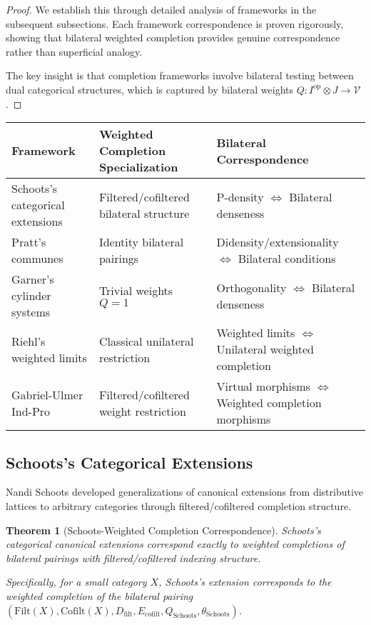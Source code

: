 \documentclass[11pt]{article}
\theoremstyle{plain}
\newtheorem{theorem}{Theorem}[section]
\theoremstyle{definition}
\theoremstyle{remark}
\newcommand{\V}{\mathcal{V}}
\newcommand{\op}{\mathrm{op}}
\begin{document}
\begin{proof}
We establish this through detailed analysis of frameworks in the subsequent subsections. Each framework correspondence is proven rigorously, showing that bilateral weighted completion provides genuine correspondence rather than superficial analogy.

The key insight is that completion frameworks involve bilateral testing between dual categorical structures, which is captured by bilateral weights $Q : I^{\op} \otimes J \to \V$.
\end{proof}

\begin{center}
\renewcommand{\arraystretch}{1.4}
\begin{longtable}{@{}p{3.5cm}p{3.5cm}p{7cm}@{}}
\toprule
\textbf{Framework} & \textbf{Weighted Completion Specialization} & \textbf{Bilateral Correspondence} \\
\midrule
Schoots's categorical extensions & Filtered/cofiltered bilateral structure & P-density $\Leftrightarrow$ Bilateral denseness \\
\addlinespace
Pratt's communes & Identity bilateral pairings & Didensity/extensionality $\Leftrightarrow$ Bilateral conditions \\
\addlinespace
Garner's cylinder systems & Trivial weights $Q = 1$ & Orthogonality $\Leftrightarrow$ Bilateral denseness \\
\addlinespace
Riehl's weighted limits & Classical unilateral restriction & Weighted limits $\Leftrightarrow$ Unilateral weighted completion \\
\addlinespace
Gabriel-Ulmer Ind-Pro & Filtered/cofiltered weight restriction & Virtual morphisms $\Leftrightarrow$ Weighted completion morphisms \\
\bottomrule
\end{longtable}
\end{center}

\subsection{Schoots's Categorical Extensions}

Nandi Schoots \cite{schoots2015generalising} developed generalizations of canonical extensions from distributive lattices to arbitrary categories through filtered/cofiltered completion structure.

\begin{theorem}[Schoots-Weighted Completion Correspondence]\label{thm:schoots-correspondence}
Schoots's categorical canonical extensions correspond exactly to weighted completions of bilateral pairings with filtered/cofiltered indexing structure.

Specifically, for a small category $X$, Schoots's extension corresponds to the weighted completion of the bilateral pairing $(\text{Filt}(X), \text{Cofilt}(X), D_{\text{filt}}, E_{\text{cofilt}}, Q_{\text{Schoots}}, \theta_{\text{Schoots}})$.
\end{theorem}
\end{document}
